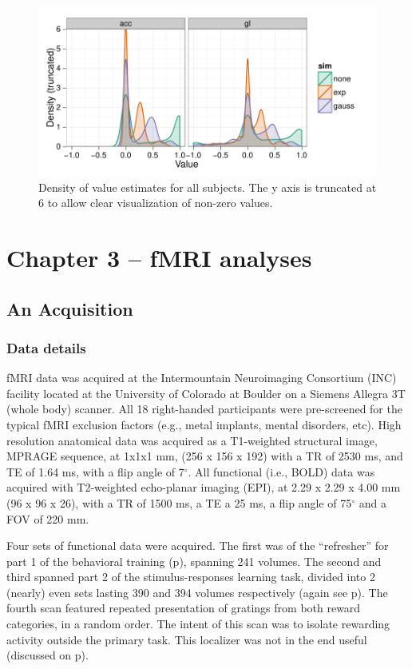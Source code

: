 \documentclass[doc,12pt]{apa}        %
\begin{document}
\begin{figure}[tp]
	\includegraphics{f_density_value}
    \centering
    \caption{Density of value estimates for all subjects.  The y axis is truncated at 6 to allow clear visualization of non-zero values.}
	\label{fig:denvalue}
\end{figure}

\clearpage
\newpage
\section{Chapter 3 -- fMRI analyses} %
\label{sec:task_and_models}
\subsection{An Acquisition}
\label{sub:acquired}
\subsubsection{Data details}
\label{subsub:datadetails}
fMRI data was acquired at the Intermountain Neuroimaging Consortium (INC) facility located at the University of Colorado at Boulder on a Siemens Allegra 3T (whole body) scanner.  All 18 right-handed participants were pre-screened for the typical fMRI exclusion factors (e.g., metal implants, mental disorders, etc).  High resolution anatomical data was acquired as a T1-weighted structural image, MPRAGE sequence, at 1x1x1 mm, (256 x 156 x 192) with a TR of 2530 ms, and TE of 1.64 ms, with a flip angle of 7$^\circ$.  All functional (i.e., BOLD) data was acquired with T2-weighted echo-planar imaging (EPI), at 2.29 x 2.29 x 4.00 mm (96 x 96 x 26), with a TR of 1500 ms, a TE a 25 ms, a flip angle of 75$^\circ$ and a FOV of 220 mm.

Four sets of functional data were acquired.  The first was of the ``refresher'' for part 1 of the behavioral training (p\pageref{subsub:whatwhen}), spanning 241 volumes.  The second and third spanned part 2 of the stimulus-responses learning task, divided into 2 (nearly) even sets lasting 390 and 394 volumes respectively (again see p\pageref{subsub:whatwhen}).  The fourth scan featured repeated presentation of gratings from both reward categories, in a random order.  The intent of this scan was to isolate rewarding activity outside the primary task. This localizer was not in the end useful (discussed on p\pageref{subsub:chunks}).
\end{document}
